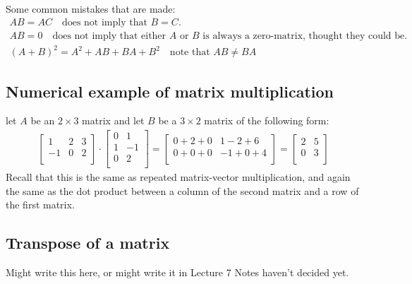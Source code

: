 \documentclass[11pt, a4paper]{article}
\begin{document}
Some common mistakes that are made:
\begin{gather}
  AB = AC \quad \text{does not imply that $B = C$.}\\
  AB = 0 \quad \text{does not imply that either $A$ or $B$ is always a zero-matrix, thought they could be.}\\
  (A + B)^2 = A^2 + AB + BA + B^2 \quad \text{note that $AB \neq BA$}
\end{gather}

\subsection{Numerical example of matrix multiplication}
let $A$ be an $2 \times 3$ matrix and let $B$ be a $3 \times 2$ matrix of the following form:
\begin{align*}
  \begin{bmatrix}
    1  & 2 & 3\\
    -1 & 0 & 2\\
  \end{bmatrix}
  \cdot
  \begin{bmatrix}
    0 & 1\\
    1 & -1\\
    0 & 2\\
  \end{bmatrix}
  =
  \begin{bmatrix}
    0 + 2 + 0 & 1 - 2 + 6\\
    0 + 0 + 0 & -1 +0 + 4\\
  \end{bmatrix}
  =
  \begin{bmatrix}
    2 & 5\\
    0 & 3\\
  \end{bmatrix}
\end{align*}
Recall that this is the same as repeated matrix-vector multiplication, and again
the same as the dot product between a column of the second matrix and a row of the first matrix.

\subsection{Transpose of a matrix}
Might write this here, or might write it in Lecture 7 Notes haven't decided yet.
\end{document}
